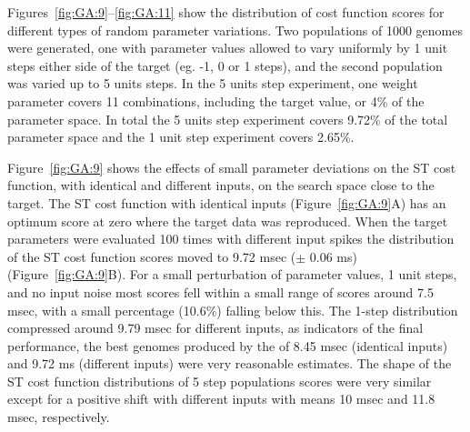 





Figures~\ref{fig:GA:9}--\ref{fig:GA:11} show the distribution of cost function
scores for different types of random parameter variations. Two
populations of 1000 genomes were generated, one with parameter values
allowed to vary uniformly by 1 unit steps either side of the target
(eg. -1, 0 or 1 steps), and the second population was varied up to 5
units steps.  In the 5 units step experiment, one weight parameter
covers 11 combinations, including the target value, or 4\% of the
parameter space. In total the 5 units step experiment covers 9.72\% of
the total parameter space and the 1 unit step experiment covers
2.65\%.

\smallskip{}

Figure~\ref{fig:GA:9} shows the effects of small parameter deviations
on the ST cost function, with identical and different {\ANF} inputs, on
the search space close to the target. The ST cost function with
identical {\ANF} inputs (Figure~\ref{fig:GA:9}A) has an optimum score at zero where
the target data was reproduced. When the target parameters were
evaluated 100 times with different {\ANF} input spikes the distribution
of the ST cost function scores moved to 9.72 msec ($\pm$ 0.06 ms)
(Figure~\ref{fig:GA:9}B). For a small perturbation of parameter values, 1 unit
steps, and no input noise most scores fell within a small range of
scores around 7.5 msec, with a small percentage (10.6\%) falling below
this. The 1-step distribution compressed around 9.79 msec for different
inputs, as indicators of the {\GAs} final performance, the best genomes
produced by the {\GA} of 8.45 msec (identical inputs) and 9.72 ms
(different inputs) were very reasonable estimates.  The shape of the
ST cost function distributions of 5 step populations scores were very
similar except for a positive shift with different inputs with means
10 msec and 11.8 msec, respectively.

